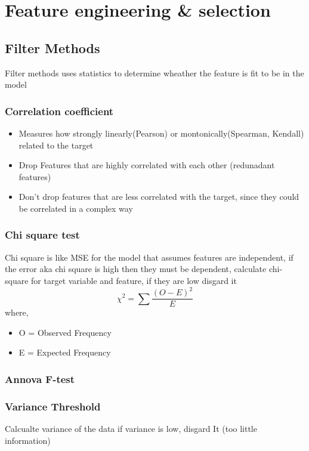 \documentclass[12pt]{extarticle}
\begin{document}
\section{Feature engineering \& selection}

\subsection{Filter Methods}
Filter methods uses statistics to determine wheather the feature is fit to be
in the model 

\subsubsection{Correlation coefficient}
\begin{itemize}
    \item Measures how strongly linearly(Pearson) or montonically(Spearman, Kendall) related
to the target
    \item Drop Features that are highly correlated with each other (redunadant features)
    \item Don't drop features that are less correlated with the target, since they could be 
        correlated in a complex way 
\end{itemize}

\subsubsection{Chi square test}
Chi square is like MSE for the model that assumes features are independent, 
if the error aka chi square is high then they must be dependent, calculate
chi-square for target variable and feature, if they are low disgard it
$$ \chi^2 = \sum \frac{(O-E)^2}{E} $$
where,
\begin{itemize}
    \item O = Observed Frequency
    \item E = Expected Frequency 
\end{itemize}

\subsubsection{Annova F-test}


\subsubsection{Variance Threshold}
Calcualte variance of the data if variance is low, disgard It
(too little information)
\end{document}
